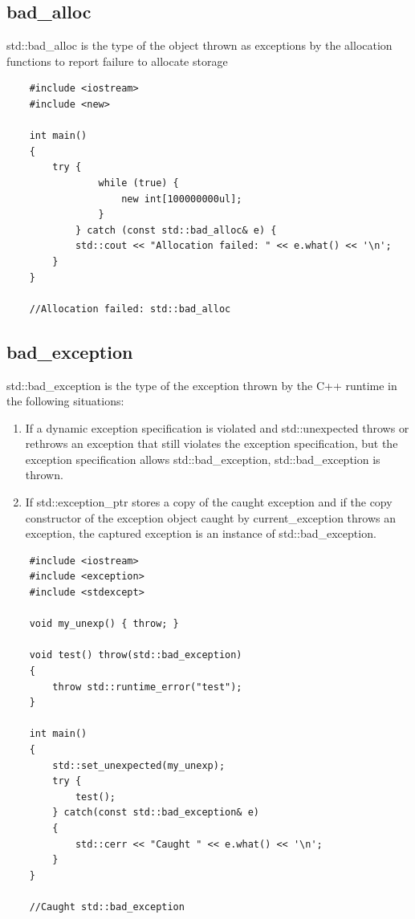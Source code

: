 \documentclass[UTF8,a4paper,12pt]{ctexbook}
\begin{document}
		\subsection{bad\_alloc}
			std::bad\_alloc is the type of the object thrown as exceptions by the allocation functions to report failure to allocate storage
\begin{lstlisting}
	#include <iostream>
	#include <new>
	
	int main()
	{
		try {
				while (true) {
					new int[100000000ul];
				}
			} catch (const std::bad_alloc& e) {
			std::cout << "Allocation failed: " << e.what() << '\n';
		}
	}
	
	//Allocation failed: std::bad_alloc
\end{lstlisting}
		\subsection{bad\_exception}
			std::bad\_exception is the type of the exception thrown by the C++ runtime in the following situations: 
			
			\begin{enumerate}
				\item If a dynamic exception specification is violated and std::unexpected throws or rethrows an exception that still violates the exception specification, but the exception specification allows std::bad\_exception, std::bad\_exception is thrown.
				\item If std::exception\_ptr stores a copy of the caught exception and if the copy constructor of the exception object caught by current\_exception throws an exception, the captured exception is an instance of std::bad\_exception.
			\end{enumerate}

\begin{lstlisting}
	#include <iostream>
	#include <exception>
	#include <stdexcept>
	
	void my_unexp() { throw; }
	
	void test() throw(std::bad_exception)
	{
		throw std::runtime_error("test");
	}
	
	int main()
	{
		std::set_unexpected(my_unexp);
		try {
			test();
		} catch(const std::bad_exception& e)
		{
			std::cerr << "Caught " << e.what() << '\n';
		}
	}
	
	//Caught std::bad_exception
\end{lstlisting}
\end{document}
